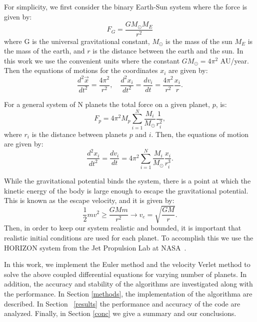 \documentclass[prc,amsmath,twocolumn,superscriptaddress]{revtex4}
\begin{document}
For simplicity, we first consider the binary Earth-Sun system where the force is given by:
\begin{equation}
F_G=\frac{GM_\odot M_E}{r^2}
\end{equation}
where G is the universal gravitational constant, $M_\odot$ is the mass of the sun $M_E$ is the mass of the earth, and $r$ is the distance between the earth and the sun. In this work we use the convenient units where the constant $GM_\odot =4\pi^2$ AU/year. Then the equations of motions for the coordinates $x_i$ are given by:
\begin{equation}
\frac{d^2\vec{x}}{dt^2} = \frac{4\pi^2}{r^2} ,\quad \frac{d^2x_i}{dt^2}=\frac{dv_i}{dt}=\frac{4\pi^2}{r^2}\frac{x_i}{r}.
\end{equation}

For a general system of N planets the total force on a given planet, $p$, is:
\begin{equation}
F_p=4\pi^2M_p\sum_{i=1}^N \frac{M_i}{M_\odot}\frac{1}{r_i^2},
\end{equation}
where $r_i$ is the distance between planets $p$ and $i$. Then, the equations of motion are given by:
\begin{equation}
\frac{d^2x_i}{dt^2}=\frac{dv_i}{dt}=4\pi^2\sum_{i=1}^N \frac{M_i}{M_\odot}\frac{x_i}{r_i^3}.
\end{equation}


While the gravitational potential binds the system, there is a point at which the kinetic energy of the body is large enough to escape the gravitational potential. This is known as the escape velocity, and it is given by:
\begin{equation}
\frac{1}{2}mv^2\geq \frac{GMm}{r^2} \rightarrow v_{e}=\sqrt{\frac{GM}{r}}.
\end{equation}
Then, in order to keep our system realistic and bounded, it is important that realistic initial conditions are used for each planet. To accomplish this we use the HORIZON system from the Jet Propulsion Lab at NASA~\cite{horizon}.

In this work, we implement the Euler method and the velocity Verlet method to solve the above coupled differential equations for varying number of planets. In addition, the accuracy and stability of the algorithms are investigated along with the performance. In Section \ref{methods}, the implementation of the algorithma are described. In Section ~\ref{results} the performance and accuracy of the code are analyzed. Finally, in Section \ref{conc} we give a summary and our conclusions.
\end{document}
